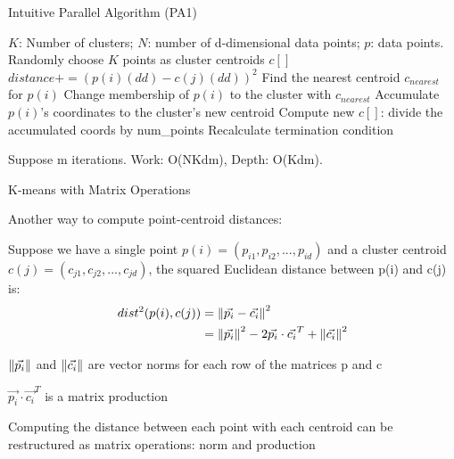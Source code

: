 \documentclass[
nopagebreaks,
style=klope,
fleqn]{powerdot}
\begin{document}
\begin{slide} {Intuitive Parallel Algorithm (PA1)}
  \footnotesize
  \begin{algorithmic}[1]
    \INPUT $K$: Number of clusters; $N$: number of d-dimensional data points; $p$: data points.
     \label{alg:p}
    \State Randomly choose $K$ points as cluster centroids $c[]$
    \State $distance += (p(i)(dd) - c(j)(dd))^2$
    \EndFor
    \EndFor
    \State Find the nearest centroid $c_{nearest}$ for $p(i)$
    \State Change membership of $p(i)$ to the cluster with $c_{nearest}$
    \State Accumulate $p(i)$'s coordinates to the cluster's new centroid
    \EndParFor
    \State Compute new $c[]$: divide the accumulated coords by num\_points
    \State Recalculate termination condition
    \EndWhile
    \EndFunction  
  \end{algorithmic}
  \begin{compactitem}
    \vspace{2mm}
  \item{Suppose m iterations. 
    Work: O(NKdm), Depth: O(Kdm).}
  \end{compactitem}
\end{slide}

\begin{slide}{K-means with Matrix Operations}
  \footnotesize
  \begin{compactitem}
  \item{Another way to compute point-centroid distances:}
  \item{Suppose we have a single point $p(i) = (p_{i1}, p_{i2}, ..., p_{id})$ 
      and a cluster centroid $c(j) = (c_{j1}, c_{j2}, ..., c_{jd})$, 
      the squared Euclidean distance between p(i) and c(j) is: 
    \begin{align}
      dist^2(p(i),c(j)) &= \left\lVert\vec{p_i} - \vec{c_i}\right\rVert^2 \\
             &= \left\lVert\vec{p_i}\right\rVert^2 - 2 \vec{p_i} \cdot \vec{c_i}^T + \left\lVert\vec{c_i}\right\rVert^2
  \end{align}}
  \item{
      $\left\lVert\vec{p_i}\right\rVert$ and $\left\lVert\vec{c_i}\right\rVert$ are vector norms for each row of the matrices p and c
  }
  \item{
      $\vec{p_i} \cdot \vec{c_i}^T$ is a matrix production 
  }
  \item{Computing the distance between each point with each centroid can be restructured as matrix operations: norm and production}
  \end{compactitem}
\end{slide}
\end{document}
